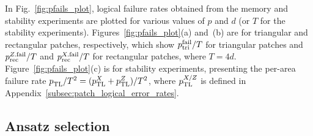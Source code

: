 \documentclass[
 prx,
 reprint,
 superscriptaddress,
 longbibliography,
 dvipsnames
]{revtex4-2}
\begin{document}
In Fig.~\ref{fig:pfails_plot}, logical failure rates obtained from the memory and stability experiments are plotted for various values of $p$ and $d$ (or $T$ for the stability experiments).
Figures~\ref{fig:pfails_plot}(a) and~(b) are for triangular and rectangular patches, respectively, which show $p_{\mathrm{tri}}^{\mathrm{fail}}/T$ for triangular patches and $p_{\mathrm{rec}}^{Z.\mathrm{fail}}/T$ and $p_{\mathrm{rec}}^{X.\mathrm{fail}}/T$ for rectangular patches, where $T=4d$.
Figure~\ref{fig:pfails_plot}(c) is for stability experiments, presenting the per-area failure rate $p_{\mathrm{TL}}^{}/T^2 = (p_{\mathrm{TL}}^{X} + p_{\mathrm{TL}}^{Z})/T^2$, where $p_{\mathrm{TL}}^{X/Z}$ is defined in Appendix~\ref{subsec:patch_logical_error_rates}.

\subsection{Ansatz selection}
\end{document}
